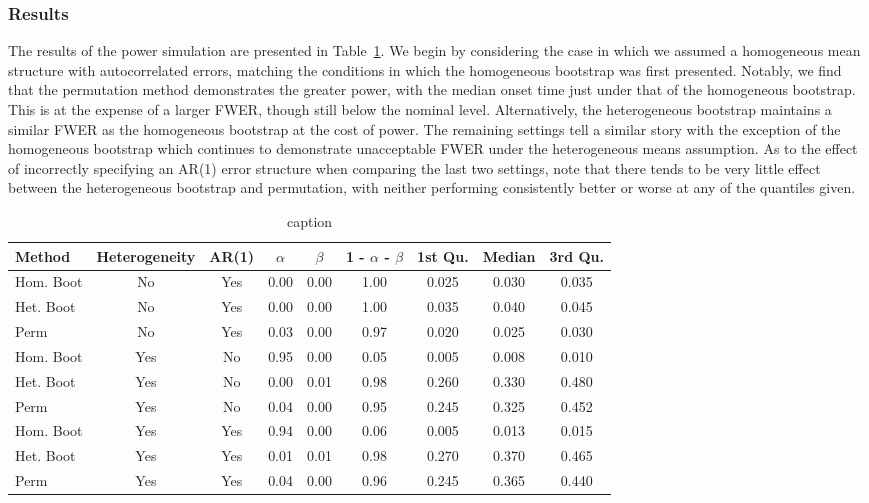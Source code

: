 \documentclass{article}
\begin{document}
\subsubsection{Results}


The results of the power simulation are presented in Table~\ref{tab:power_methods}. We begin by considering the case in which we assumed a homogeneous mean structure with autocorrelated errors, matching the conditions in which the homogeneous bootstrap was first presented. Notably, we find that the permutation method demonstrates the greater power, with the median onset time just under that of the homogeneous bootstrap. This is at the expense of a larger FWER, though still below the nominal level. Alternatively, the heterogeneous bootstrap maintains a similar FWER as the homogeneous bootstrap at the cost of power. The remaining settings tell a similar story with the exception of the homogeneous bootstrap which continues to demonstrate unacceptable FWER under the heterogeneous means assumption. As to the effect of incorrectly specifying an AR(1) error structure when comparing the last two settings, note that there tends to be very little effect between the heterogeneous bootstrap and permutation, with neither performing consistently better or worse at any of the quantiles given.


\begin{table}[H]
\centering
\begin{tabular}{lcccccccc}
  \hline
Method & Heterogeneity & AR(1) & $\alpha$ & $\beta$ & 1 - $\alpha$ - $\beta$ & 1st Qu. & Median & 3rd Qu. \\ 
  \hline
Hom. Boot & No & Yes & 0.00 & 0.00 & 1.00 & 0.025 & 0.030 & 0.035 \\ 
  Het. Boot & No & Yes & 0.00 & 0.00 & 1.00 & 0.035 & 0.040 & 0.045 \\ 
  Perm & No & Yes & 0.03 & 0.00 & 0.97 & 0.020 & 0.025 & 0.030 \\
  \hline
  Hom. Boot & Yes & No & 0.95 & 0.00 & 0.05 & 0.005 & 0.008 & 0.010 \\ 
  Het. Boot & Yes & No & 0.00 & 0.01 & 0.98 & 0.260 & 0.330 & 0.480 \\ 
  Perm & Yes & No & 0.04 & 0.00 & 0.95 & 0.245 & 0.325 & 0.452 \\
  \hline
  Hom. Boot & Yes & Yes & 0.94 & 0.00 & 0.06 & 0.005 & 0.013 & 0.015 \\ 
  Het. Boot & Yes & Yes & 0.01 & 0.01 & 0.98 & 0.270 & 0.370 & 0.465 \\ 
  Perm & Yes & Yes & 0.04 & 0.00 & 0.96 & 0.245 & 0.365 & 0.440 \\ 
   \hline
\end{tabular}
\caption{caption} 
\label{tab:power_methods}
\end{table}
\end{document}
